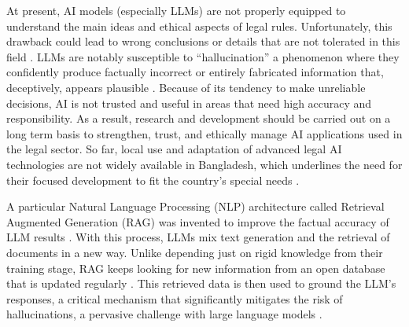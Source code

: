 At present, AI models (especially LLMs) are not properly equipped to understand the main ideas and ethical aspects of legal rules. Unfortunately, this drawback could lead to wrong conclusions or details that are not tolerated in this field \cite{terzidou2025generative}. LLMs are notably susceptible to ``hallucination'' a phenomenon where they confidently produce factually incorrect or entirely fabricated information that, deceptively, appears plausible \cite{terzidou2025generative}. Because of its tendency to make unreliable decisions, AI is not trusted and useful in areas that need high accuracy and responsibility. As a result, research and development should be carried out on a long term basis to strengthen, trust, and ethically manage AI applications used in the legal sector. So far, local use and adaptation of advanced legal AI technologies are not widely available in Bangladesh, which underlines the need for their focused development to fit the country’s special needs .

A particular Natural Language Processing (NLP)  architecture called Retrieval Augmented Generation (RAG) was invented to improve the factual accuracy of LLM results \cite{lewis2021retrievalaugmentedgenerationknowledgeintensivenlp}. With this process, LLMs mix text generation and the retrieval of documents in a new way. Unlike depending just on rigid knowledge from their training stage, RAG keeps looking for new information from an open database that is updated regularly \cite{lewis2021retrievalaugmentedgenerationknowledgeintensivenlp}. This retrieved data is then used to ground the LLM’s responses, a critical mechanism that significantly mitigates the risk of hallucinations, a pervasive challenge with large language models \cite{lewis2021retrievalaugmentedgenerationknowledgeintensivenlp}\cite{fan2024surveyragmeetingllms}.

